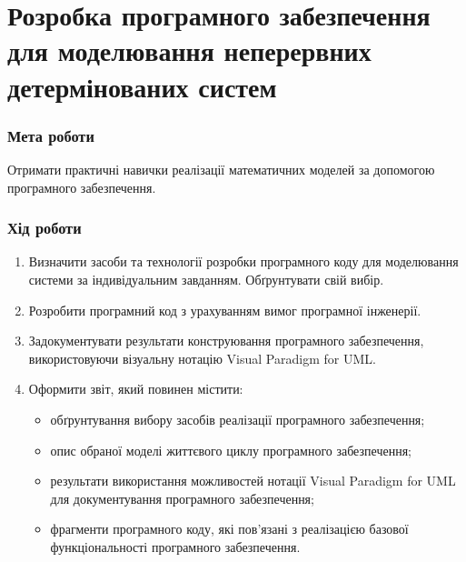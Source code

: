 


\newcommand{\labnumber}{4} %



\graphicspath{{figures/}}


\Ukrainian


\addtocounter{page}{1}

\section*{Розробка програмного забезпечення для моделювання неперервних детермінованих систем}
\subsubsection*{Мета роботи}
Отримати практичні навички реалізації математичних
моделей за допомогою програмного забезпечення.
\subsubsection*{Хід роботи}
\begin{enumerate}
\item Визначити засоби та технології розробки програмного коду для моделювання системи за індивідуальним завданням.
Обґрунтувати свій вибір.
\item Розробити програмний код з урахуванням вимог програмної інженерії.
\item Задокументувати результати конструювання програмного забезпечення, використовуючи візуальну нотацію Visual Paradigm for UML.
\item Оформити звіт, який повинен містити:
\begin{itemize}
\item обґрунтування вибору засобів реалізації програмного забезпечення;
\item опис обраної моделі життєвого циклу програмного забезпечення;
\item результати використання можливостей нотації Visual Paradigm for UML для документування програмного забезпечення;
\item фрагменти програмного коду, які пов'язані з реалізацією базової функціональності програмного забезпечення.
\end{itemize}
\end{enumerate}


